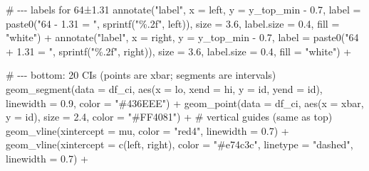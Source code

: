 \documentclass[
  letterpaper,
  DIV=11,
  numbers=noendperiod]{scrreprt}
\newenvironment{Shaded}{\begin{snugshade}}{\end{snugshade}}
\newcommand{\AttributeTok}[1]{\textcolor[rgb]{0.40,0.45,0.13}{#1}}
\newcommand{\CommentTok}[1]{\textcolor[rgb]{0.37,0.37,0.37}{#1}}
\newcommand{\FloatTok}[1]{\textcolor[rgb]{0.68,0.00,0.00}{#1}}
\newcommand{\FunctionTok}[1]{\textcolor[rgb]{0.28,0.35,0.67}{#1}}
\newcommand{\NormalTok}[1]{\textcolor[rgb]{0.00,0.23,0.31}{#1}}
\newcommand{\SpecialCharTok}[1]{\textcolor[rgb]{0.37,0.37,0.37}{#1}}
\newcommand{\StringTok}[1]{\textcolor[rgb]{0.13,0.47,0.30}{#1}}
\begin{document}
\begin{Shaded}
\begin{Highlighting}[]
  \CommentTok{\# {-}{-}{-} labels for 64±1.31}
  \FunctionTok{annotate}\NormalTok{(}\StringTok{"label"}\NormalTok{, }\AttributeTok{x =}\NormalTok{ left,  }\AttributeTok{y =}\NormalTok{ y\_top\_min }\SpecialCharTok{{-}} \FloatTok{0.7}\NormalTok{,}
           \AttributeTok{label =} \FunctionTok{paste0}\NormalTok{(}\StringTok{"64 {-} 1.31 = "}\NormalTok{, }\FunctionTok{sprintf}\NormalTok{(}\StringTok{"\%.2f"}\NormalTok{, left)),}
           \AttributeTok{size =} \FloatTok{3.6}\NormalTok{, }\AttributeTok{label.size =} \FloatTok{0.4}\NormalTok{, }\AttributeTok{fill =} \StringTok{"white"}\NormalTok{) }\SpecialCharTok{+}
  \FunctionTok{annotate}\NormalTok{(}\StringTok{"label"}\NormalTok{, }\AttributeTok{x =}\NormalTok{ right, }\AttributeTok{y =}\NormalTok{ y\_top\_min }\SpecialCharTok{{-}} \FloatTok{0.7}\NormalTok{,}
           \AttributeTok{label =} \FunctionTok{paste0}\NormalTok{(}\StringTok{"64 + 1.31 = "}\NormalTok{, }\FunctionTok{sprintf}\NormalTok{(}\StringTok{"\%.2f"}\NormalTok{, right)),}
           \AttributeTok{size =} \FloatTok{3.6}\NormalTok{, }\AttributeTok{label.size =} \FloatTok{0.4}\NormalTok{, }\AttributeTok{fill =} \StringTok{"white"}\NormalTok{) }\SpecialCharTok{+}

  \CommentTok{\# {-}{-}{-} bottom: 20 CIs (points are xbar; segments are intervals)}
  \FunctionTok{geom\_segment}\NormalTok{(}\AttributeTok{data =}\NormalTok{ df\_ci,}
               \FunctionTok{aes}\NormalTok{(}\AttributeTok{x =}\NormalTok{ lo, }\AttributeTok{xend =}\NormalTok{ hi, }\AttributeTok{y =}\NormalTok{ id, }\AttributeTok{yend =}\NormalTok{ id),}
               \AttributeTok{linewidth =} \FloatTok{0.9}\NormalTok{, }\AttributeTok{color =} \StringTok{"\#436EEE"}\NormalTok{) }\SpecialCharTok{+}
  \FunctionTok{geom\_point}\NormalTok{(}\AttributeTok{data =}\NormalTok{ df\_ci,}
             \FunctionTok{aes}\NormalTok{(}\AttributeTok{x =}\NormalTok{ xbar, }\AttributeTok{y =}\NormalTok{ id),}
             \AttributeTok{size =} \FloatTok{2.4}\NormalTok{, }\AttributeTok{color =} \StringTok{"\#FF4081"}\NormalTok{) }\SpecialCharTok{+}
  \CommentTok{\# vertical guides (same as top)}
  \FunctionTok{geom\_vline}\NormalTok{(}\AttributeTok{xintercept =}\NormalTok{ mu, }\AttributeTok{color =} \StringTok{"red4"}\NormalTok{, }\AttributeTok{linewidth =} \FloatTok{0.7}\NormalTok{) }\SpecialCharTok{+}
  \FunctionTok{geom\_vline}\NormalTok{(}\AttributeTok{xintercept =} \FunctionTok{c}\NormalTok{(left, right), }\AttributeTok{color =} \StringTok{"\#e74c3c"}\NormalTok{,}
             \AttributeTok{linetype =} \StringTok{"dashed"}\NormalTok{, }\AttributeTok{linewidth =} \FloatTok{0.7}\NormalTok{) }\SpecialCharTok{+}


\end{Highlighting}
\end{Shaded}
\end{document}
